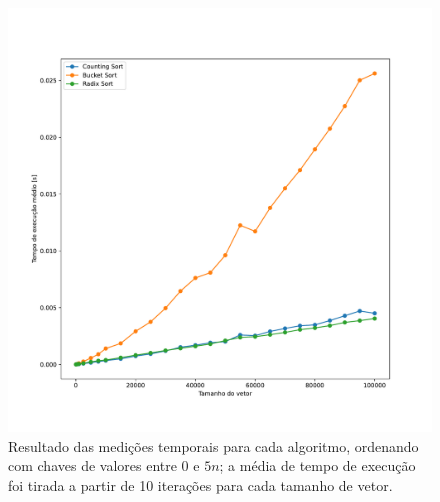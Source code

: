 \documentclass[fontsize=10pt]{article}
\begin{document}
\begin{figure}[]
\begin{center}
    \includegraphics[scale=0.4]{imagens/0502.pdf}
    \caption{Resultado das medições temporais para cada algoritmo, ordenando com chaves de valores entre 0 e $5n$; a média de tempo de execução foi tirada a partir de 10 iterações para cada tamanho de vetor.}
    \label{Figura 2}
\end{center}
\end{figure}
\end{document}
